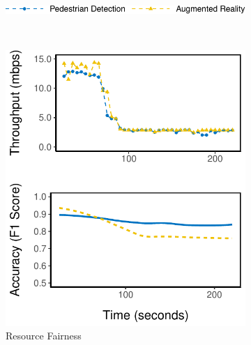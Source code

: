 \begin{figure}
  \begin{subfigure}[t]{0.9\columnwidth}
    \centering
    \includegraphics[width=\textwidth]{figures/multitask-legend.pdf}
  \end{subfigure}
  \\
  \vspace{1em}
  \begin{subfigure}[t]{0.49\columnwidth}
    \centering
    \includegraphics[width=\textwidth]{figures/multitask-eq-bw.pdf}
    \caption{Resource Fairness}
    \label{fig:eq-bw}
  \end{subfigure}
  \hfill
  \begin{subfigure}[t]{0.49\columnwidth}
    \centering

\end{subfigure}
\end{figure}
